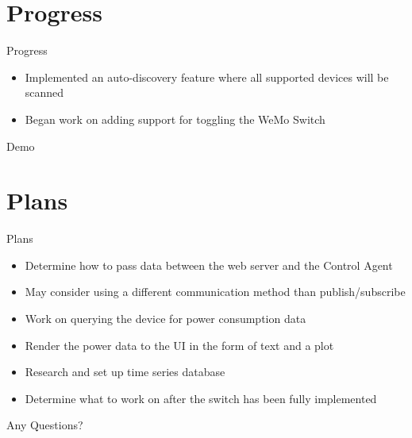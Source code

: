 \documentclass{beamer}
\begin{document}
\section{Progress}
\begin{frame}{Progress}
\begin{itemize}
	\item Implemented an auto-discovery feature where all supported devices will be scanned
	\item Began work on adding support for toggling the WeMo Switch
\end{itemize}
\end{frame}

\begin{frame}
\Huge
\center
Demo
\end{frame}


\section{Plans}
\begin{frame}{Plans}{}
\begin{itemize}
\item Determine how to pass data between the web server and the Control Agent
\item May consider using a different communication method than publish/subscribe
\item Work on querying the device for power consumption data
\item Render the power data to the UI in the form of text and a plot
\item Research and set up time series database
\item Determine what to work on after the switch has been fully implemented
\end{itemize}
\end{frame}

\begin{frame}
\Huge
\center
Any Questions?
\end{frame}
\end{document}
